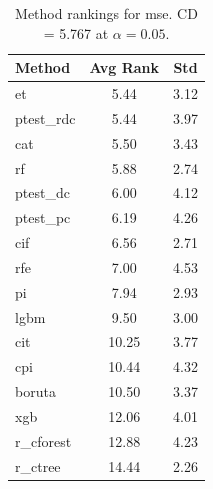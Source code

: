 \begin{table}[h]
\centering
\caption{Method rankings for mse. CD = 5.767 at $\alpha=0.05$.}
\label{tab:ranks_mse}
\begin{tabular}{lcc}
\toprule
Method & Avg Rank & Std \\
\midrule
et & 5.44 & 3.12 \\
ptest_rdc & 5.44 & 3.97 \\
cat & 5.50 & 3.43 \\
rf & 5.88 & 2.74 \\
ptest_dc & 6.00 & 4.12 \\
ptest_pc & 6.19 & 4.26 \\
cif & 6.56 & 2.71 \\
rfe & 7.00 & 4.53 \\
pi & 7.94 & 2.93 \\
lgbm & 9.50 & 3.00 \\
cit & 10.25 & 3.77 \\
cpi & 10.44 & 4.32 \\
boruta & 10.50 & 3.37 \\
xgb & 12.06 & 4.01 \\
r_cforest & 12.88 & 4.23 \\
r_ctree & 14.44 & 2.26 \\
\bottomrule
\end{tabular}
\end{table}